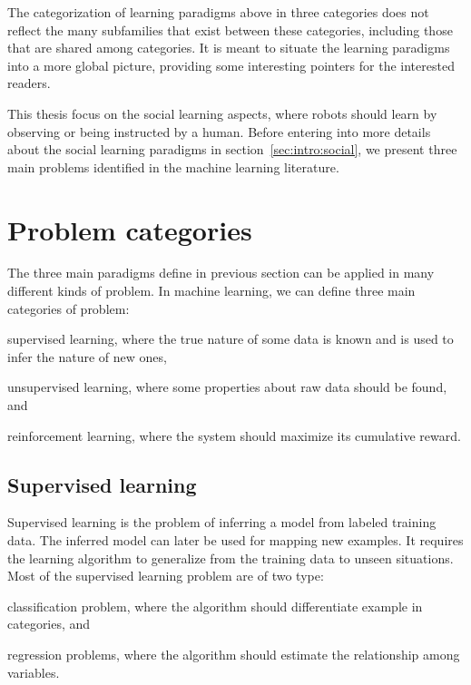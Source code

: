\transition

The categorization of learning paradigms above in three categories does not reflect the many subfamilies that exist between these categories, including those that are shared among categories. It is meant to situate the learning paradigms into a more global picture, providing some interesting pointers for the interested readers. 

This thesis focus on the social learning aspects, where robots should learn by observing or being instructed by a human. Before entering into more details about the social learning paradigms in section~\ref{sec:intro:social}, we present three main problems identified in the machine learning literature.

\section{Problem categories}

The three main paradigms define in previous section can be applied in many different kinds of problem. In machine learning, we can define three main categories of problem: \begin{inparaenum}[(a)] \item supervised learning, where the true nature of some data is known and is used to infer the nature of new ones, \item unsupervised learning, where some properties about raw data should be found, and \item reinforcement learning, where the system should maximize its cumulative reward. \end{inparaenum}

\subsection{Supervised learning}

Supervised learning is the problem of inferring a model from labeled training data. The inferred model can later be used for mapping new examples. It requires the learning algorithm to generalize from the training data to unseen situations. Most of the supervised learning problem are of two type: \begin{inparaenum}[(a)] \item classification problem, where the algorithm should differentiate example in categories, and \item regression problems, where the algorithm should estimate the relationship among variables.\end{inparaenum}

